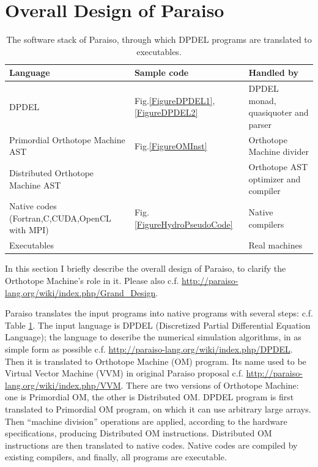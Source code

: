 \documentclass[twocolumn]{article}
\begin{document}
\section{Overall Design of Paraiso}

\begin{table}
  \begin{tabular}{|l|l|l|}
    \hline 
    Language                             &  Sample code & Handled by \\
    \hline 
    DPDEL                                & Fig.\ref{FigureDPDEL1},\ref{FigureDPDEL2} & DPDEL monad, quasiquoter and parser     \\
    Primordial Orthotope Machine AST     & Fig.\ref{FigureOMInst} & Orthotope Machine divider \\
    Distributed Orthotope Machine AST    & & Orthotope AST optimizer and compiler \\
    Native codes (Fortran,C,CUDA,OpenCL with MPI) & Fig.\ref{FigureHydroPseudoCode} & Native compilers\\
    Executables                          & & Real machines \\
    \hline
  \end{tabular}
  \caption{
    The software stack of Paraiso, through which DPDEL programs are translated to executables.
  }\label{TableSoftwareStack}
\end{table}

In this section I briefly describe the overall design of Paraiso, to clarify
the Orthotope Machine's role in it. Please also
c.f. \url{http://paraiso-lang.org/wiki/index.php/Grand_Design}.

Paraiso translates the input programs into native programs with several steps:
c.f. Table \ref{TableSoftwareStack}. The input language is DPDEL (Discretized
Partial Differential Equation Language); the language to describe the
numerical simulation algorithms, in as simple form as possible
c.f. \url{http://paraiso-lang.org/wiki/index.php/DPDEL}.  Then it is
translated to Orthotope Machine (OM) program. Its name used to be Virtual
Vector Machine (VVM) in original Paraiso proposal c.f.
\url{http://paraiso-lang.org/wiki/index.php/VVM}. There are two versions of
Orthotope Machine: one is Primordial OM, the other is Distributed OM.  DPDEL
program is first translated to Primordial OM program, on which it can use
arbitrary large arrays. Then ``machine division'' operations are applied,
according to the hardware specifications, producing Distributed OM
instructions. Distributed OM instructions are then translated to native
codes. Native codes are compiled by existing compilers, and finally, all
programs are executable.
\end{document}
